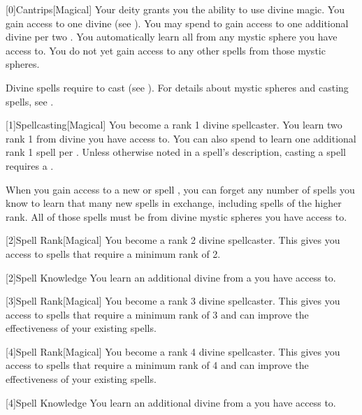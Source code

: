         [0]{Cantrips}[Magical]
        Your deity grants you the ability to use divine magic.
        You gain access to one divine  (see ).
        You may spend  to gain access to one additional divine  per two .
        You automatically learn all  from any mystic sphere you have access to.
        You do not yet gain access to any other spells from those mystic spheres.

        Divine spells require  to cast (see ).
        For details about mystic spheres and casting spells, see .

        [1]{Spellcasting}[Magical]
        You become a rank 1 divine spellcaster.
        You learn two rank 1  from divine  you have access to.
        You can also spend  to learn one additional rank 1 spell per .
        Unless otherwise noted in a spell's description, casting a spell requires a .

        When you gain access to a new  or spell ,
            you can forget any number of spells you know to learn that many new spells in exchange,
            including spells of the higher rank.
        All of those spells must be from divine mystic spheres you have access to.

        [2]{Spell Rank}[Magical] You become a rank 2 divine spellcaster.
        This gives you access to spells that require a minimum rank of 2.

        [2]{Spell Knowledge} You learn an additional divine  from a  you have access to.

        [3]{Spell Rank}[Magical] You become a rank 3 divine spellcaster.
        This gives you access to spells that require a minimum rank of 3 and can improve the effectiveness of your existing spells.

        [4]{Spell Rank}[Magical] You become a rank 4 divine spellcaster.
        This gives you access to spells that require a minimum rank of 4 and can improve the effectiveness of your existing spells.

        [4]{Spell Knowledge} You learn an additional divine  from a  you have access to.


